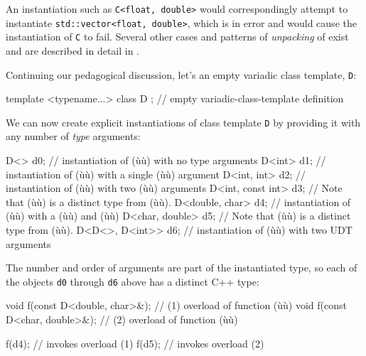 An instantiation such as \lstinline!C<float,!~\lstinline!double>! would
correspondingly attempt to instantiate
\lstinline!std::vector<float,!~\lstinline!double>!, which is in error and
would cause the instantiation of \lstinline!C! to fail. Several other cases
and patterns of \emph{unpacking} of 
exist and are described in detail in .

Continuing our pedagogical discussion, let's  an empty
variadic class template, \lstinline!D!:

\begin{emcppslisting}
template <typename...> class D { };  // empty variadic-class-template definition
\end{emcppslisting}
    

\noindent We can now create explicit instantiations of class template \lstinline!D!
by providing it with any number of \emph{type} arguments:

\begin{emcppslisting}
D<>               d0;  // instantiation of (ù{}ù) with no type arguments
D<int>            d1;  // instantiation of (ù{}ù) with a single (ù{}ù) argument
D<int, int>       d2;  // instantiation of (ù{}ù) with two (ù{}ù) arguments
D<int, const int> d3;  // Note that (ù{}ù) is a distinct type from (ù{}ù).
D<double, char>   d4;  // instantiation of (ù{}ù) with a (ù{}ù) and (ù{}ù)
D<char, double>   d5;  // Note that (ù{}ù) is a distinct type from (ù{}ù).
D<D<>, D<int>>   d6;   // instantiation of (ù{}ù) with two UDT arguments
\end{emcppslisting}
    

\noindent The number and order of arguments are part of the instantiated type, so
each of the objects \lstinline!d0! through \lstinline!d6! above has a distinct
C++ type:

\begin{emcppslisting}
void f(const D<double, char>&);  // (1) overload of function (ù{}ù)
void f(const D<char, double>&);  // (2) overload of function (ù{}ù)

f(d4);                           // invokes overload (1)
f(d5);                           // invokes overload (2)
\end{emcppslisting}
    

